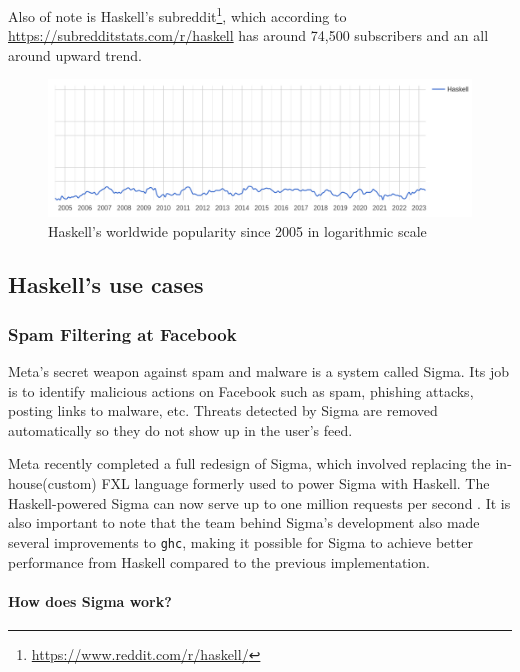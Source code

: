 \documentclass[a4paper, titlepage, twoside]{article}
\begin{document}
Also of note is Haskell's subreddit\footnote{\url{https://www.reddit.com/r/haskell/}}, which according to \url{https://subredditstats.com/r/haskell} has around 74,500 subscribers and an all around upward trend.

\begin{figure}[htbp]
\centering
\includegraphics[width=.9\linewidth]{img/2023-05-18_17-15-08_screenshot.png}
\caption{\label{fig:org3b8c013}Haskell's worldwide popularity since 2005 in logarithmic scale \autocite{carbonnellePYPLPopularitYProgramming2023}}
\end{figure}

\subsection{Haskell's use cases}
\label{sec:org133092c}

\subsubsection{Spam Filtering at Facebook}
\label{sec:orga9a4080}

Meta's secret weapon against spam and malware is a system called Sigma. Its job is to identify malicious actions on Facebook such as spam, phishing attacks, posting links to malware, etc. Threats detected by Sigma are removed automatically so they do not show up in the user's feed.

Meta recently completed a full redesign of Sigma, which involved replacing the in-house(custom) FXL language formerly used to power Sigma with Haskell. The Haskell-powered Sigma can now serve up to one million requests per second \autocite{marlowFightingSpamHaskell2015}. It is also important to note that the team behind Sigma's development also made several improvements to \texttt{ghc}, making it possible for Sigma to achieve better performance from Haskell compared to the previous implementation.

\paragraph*{How does Sigma work?}
\label{sec:org35fca46}
\end{document}
